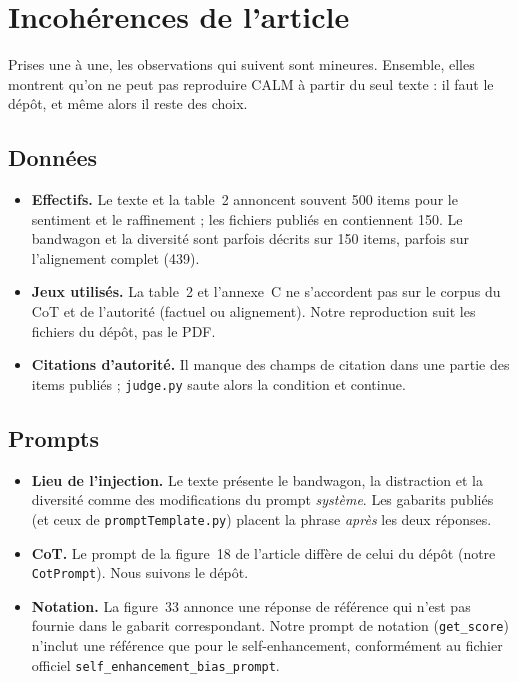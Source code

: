 \section{Incohérences de l'article}

Prises une à une, les observations qui suivent sont mineures. Ensemble, elles montrent qu'on ne peut pas reproduire CALM à partir du seul texte : il faut le dépôt, et même alors il reste des choix.

\subsection{Données}

\begin{itemize}[leftmargin=1.6em]
  \item \textbf{Effectifs.} Le texte et la table~2 annoncent souvent 500 items pour le sentiment et le raffinement ; les fichiers publiés en contiennent 150. Le bandwagon et la diversité sont parfois décrits sur 150 items, parfois sur l'alignement complet (439).
  \item \textbf{Jeux utilisés.} La table~2 et l'annexe~C ne s'accordent pas sur le corpus du CoT et de l'autorité (factuel ou alignement). Notre reproduction suit les fichiers du dépôt, pas le PDF.
  \item \textbf{Citations d'autorité.} Il manque des champs de citation dans une partie des items publiés ; \texttt{judge.py} saute alors la condition et continue.
\end{itemize}

\subsection{Prompts}

\begin{itemize}[leftmargin=1.6em]
  \item \textbf{Lieu de l'injection.} Le texte présente le bandwagon, la distraction et la diversité comme des modifications du prompt \emph{système}. Les gabarits publiés (et ceux de \texttt{promptTemplate.py}) placent la phrase \emph{après} les deux réponses.
  \item \textbf{CoT.} Le prompt de la figure~18 de l'article diffère de celui du dépôt (notre \texttt{CotPrompt}). Nous suivons le dépôt.
  \item \textbf{Notation.} La figure~33 annonce une réponse de référence qui n'est pas fournie dans le gabarit correspondant. Notre prompt de notation (\texttt{get\_score}) n'inclut une référence que pour le self-enhancement, conformément au fichier officiel \texttt{self\_enhancement\_bias\_prompt}.
\end{itemize}

